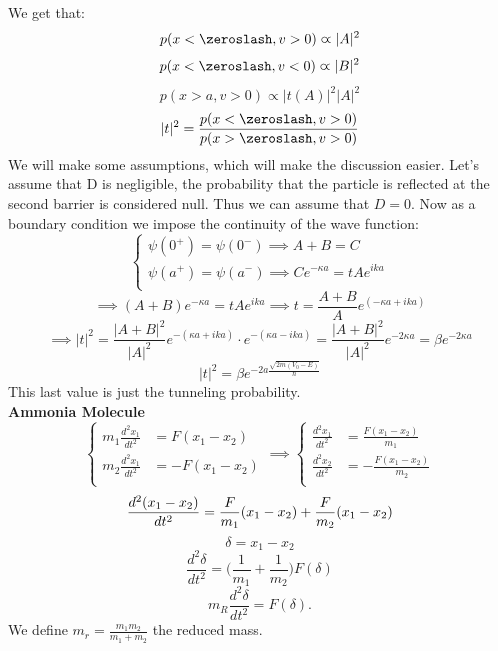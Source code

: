 \documentclass{article}
\begin{document}
We get that:
$$p(x< \zeroslash,v>0) \varpropto |A|^2$$
$$p(x< \zeroslash,v<0) \varpropto |B|^2$$
$$p(x>a,v>0) \varpropto|t(A)|^2 |A|^2$$
$$|t|^2 = \frac{p(x< \zeroslash,v>0)}{p(x> \zeroslash,v>0)}$$
We will make some assumptions, which will make the discussion easier. Let's assume that D is negligible, the probability that the particle is reflected at the second barrier is considered null. Thus we can assume that $D=0$. Now as a boundary condition we impose the continuity of the wave function:
$$ \begin{cases}  
 \psi(0^+) = \psi(0^-) \implies A+B = C \\
 \psi(a^+) = \psi(a^-) \implies Ce^{-\kappa a} = tAe^{ika} \\
\end{cases}
$$
$$\implies (A+B)e^{-\kappa a} = tAe^{ika} \implies t = \frac{A+B}{A}e^{(-\kappa a+ik a)}$$
$$\implies |t|^2 = \frac{|A+B|^2}{|A|^2} e^{-(\kappa a +ik a)} \cdot e^{-(\kappa a-ika)} = \frac{|A+B|^2}{|A|^2}  e^{-2\kappa a} = \beta e^{-2\kappa a} $$
$$|t|^2 = \beta e^{-2a \frac{\sqrt{2m(V_0-E)}}{\hslash}}$$
This last value is just the tunneling probability. \\
\textbf{Ammonia Molecule} \\ 
$$
\begin{cases}
    m_1 \frac{d^2 x_1}{dt^2} &= F(x_1 - x_2) \\
 m_2 \frac{d^2 x_1}{dt^2} &= - F(x_1 - x_2) \\
\end{cases} \implies \begin{cases}
   \frac{d^2 x_1}{dt^2} &=  \frac{F(x_1 - x_2)}{m_1} \\
   \frac{d^2 x_2}{dt^2} &= -\frac{F(x_1-x_2)}{m_2} \\
\end{cases} $$
$$
\frac{d^2 (x_1 - x_2)}{dt^2} = \frac{F}{m_1} (x_1 - x_2) + \frac{F}{m_2} (x_1 - x_2) \\$$
$$\delta = x_1 - x_2 $$
$$ \frac{d^2 \delta}{dt^2} = \biggl(\frac{1}{m_1} + \frac{1}{m_2} \biggl) F(\delta) $$
$$m_R \frac{d^2 \delta}{dt^2} = F(\delta).
$$
We define $m_r = \frac{m_1m_2}{m_1+m_2}$ the reduced mass.
\end{document}
